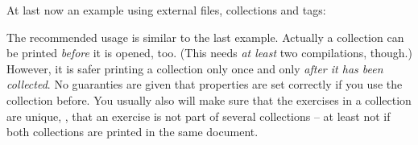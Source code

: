 \documentclass{xsim-manual}
\begin{document}
At last now an example using external files, collections and tags:
\begin{sourcecode}

  

  
\end{sourcecode}

\begin{bewareofthedog}
  The recommended usage is similar to the last example.  Actually a collection
  can be printed \emph{before} it is opened, too.  (This needs \emph{at least}
  two compilations, though.)  However, it is safer printing a collection only
  once and only \emph{after it has been collected}.  No guaranties are given
  that properties are set correctly if you use the collection before.  You
  usually also will make sure that the exercises in a collection are unique,
  \ie, that an exercise is not part of several collections -- at least not if
  both collections are printed in the same document.
\end{bewareofthedog}
\end{document}
